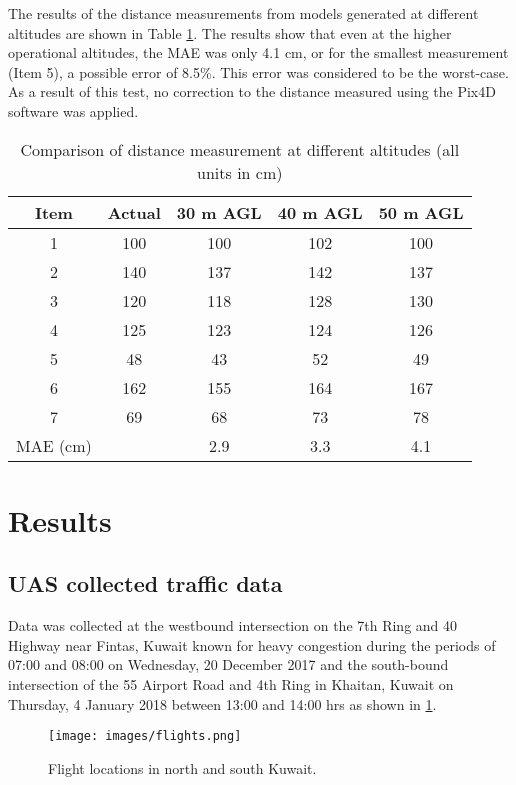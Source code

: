\documentclass[preprint,12pt,a4paper]{elsarticle}
\begin{document}
\begin{linenumbers}
The results of the distance measurements from models generated at different altitudes are shown in Table \ref{tab:uascalibrate}. The results show that even at the higher operational altitudes, the MAE was only 4.1 cm, or for the smallest measurement (Item 5), a possible error of 8.5\%. This error was considered to be the worst-case. As a result of this test, no correction to the distance measured using the Pix4D software was applied.

%
\begin{table}[H]
\centering
\caption[Comparison of distance measurement at different altitudes]{Comparison of distance measurement at different altitudes (all units in cm)}
\label{tab:uascalibrate}
\begin{tabular}{@{}ccccc@{}}
\toprule
\textbf{Item} & \textbf{Actual} & \textbf{30 m AGL} & \textbf{40 m AGL} & \textbf{50 m AGL} \\ \midrule
1 & 100 & 100 & 102 & 100 \\
2 & 140 & 137 & 142 & 137 \\
3 & 120 & 118 & 128 & 130 \\
4 & 125 & 123 & 124 & 126 \\
5 & 48 & 43 & 52 & 49 \\
6 & 162 & 155 & 164 & 167 \\
7 & 69 & 68 & 73 & 78 \\
MAE (cm)&  & 2.9 & 3.3 & 4.1 \\ \bottomrule
\end{tabular}
\end{table}


\section{Results}
\subsection{UAS collected traffic data}
Data was collected at the westbound intersection on the 7th Ring and 40 Highway near Fintas, Kuwait known for heavy congestion during the periods of 07:00 and 08:00 on Wednesday, 20 December 2017 and the south-bound intersection of the 55 Airport Road and 4th Ring in Khaitan, Kuwait on Thursday, 4 January 2018 between 13:00 and 14:00 hrs as shown in \ref{fig:flights}. 


\begin{figure}[H]
\centering
\texttt{[image: images/flights.png]} 
\caption[Flight locations]{Flight locations in north and south Kuwait.}
\label{fig:flights}
\end{figure}


\end{linenumbers}
\end{document}

